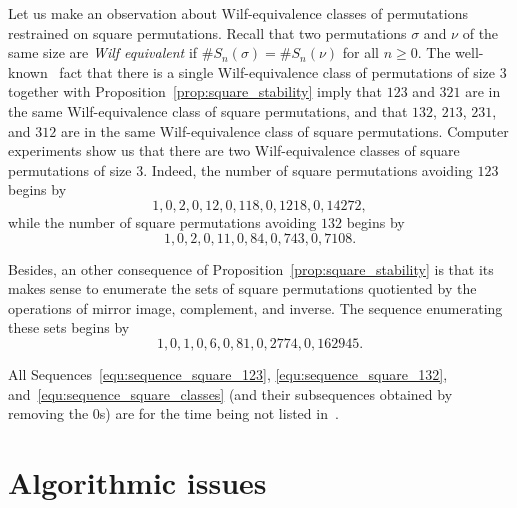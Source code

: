 \documentclass[a4paper]{llncs}
\begin{document}
Let us make an observation about Wilf-equivalence classes of permutations
restrained on square permutations. Recall that two permutations $\sigma$
and $\nu$ of the same size are {\em Wilf equivalent} if
$\# S_n(\sigma) = \# S_n(\nu)$ for all $n \geq 0$. The
well-known~\cite{Simion:Schmidt:EJC:1985} fact that there is a single
Wilf-equivalence class of permutations of size $3$ together with
Proposition~\ref{prop:square_stability} imply that $123$ and $321$ are
in the same Wilf-equivalence class of square permutations, and that
$132$, $213$, $231$, and $312$ are in the same Wilf-equivalence class of
square permutations. Computer experiments show us that there are two
Wilf-equivalence classes of square permutations of size $3$. Indeed, the
number of square permutations avoiding $123$ begins by
\begin{equation} \label{equ:sequence_square_123}
    1, 0, 2, 0, 12, 0, 118, 0, 1218, 0, 14272,
\end{equation}
while the number of square permutations avoiding $132$ begins by
\begin{equation} \label{equ:sequence_square_132}
    1, 0, 2, 0, 11, 0, 84, 0, 743, 0, 7108.
\end{equation}

Besides, an other consequence of Proposition~\ref{prop:square_stability}
is that its makes sense to enumerate the sets of square permutations
quotiented by the operations of mirror image, complement, and
inverse. The sequence enumerating these sets begins by
\begin{equation} \label{equ:sequence_square_classes}
    1, 0, 1, 0, 6, 0, 81, 0, 2774, 0, 162945.
\end{equation}

All Sequences~\eqref{equ:sequence_square_123}, \eqref{equ:sequence_square_132},
and~\eqref{equ:sequence_square_classes} (and their subsequences obtained
by removing the $0$s) are for the time being not listed in~\cite{Slo}.


\section{Algorithmic issues}
\label{section:Algorithmic issues}
\end{document}
